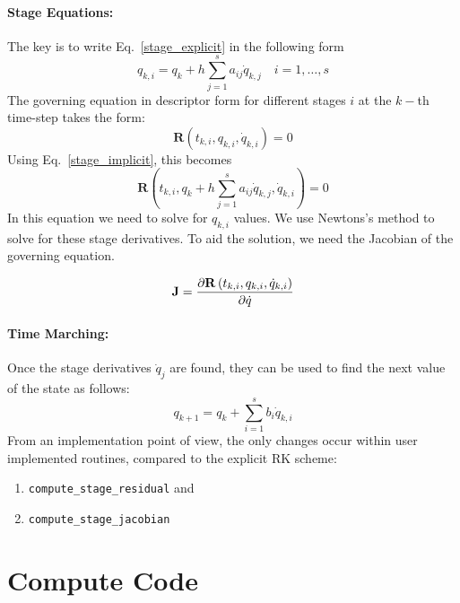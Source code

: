 \documentclass[pdftex,11pt,letter]{article}
\begin{document}
\paragraph{Stage Equations:}
The key is to write Eq.~\ref{stage_explicit} in the following form
\begin{equation}\label{stage_implicit}
  q_{k,i} = q_{k} + h \sum_{j=1}^s a_{ij} \dot{q}_{k,j} \quad i = 1,\ldots,s 
\end{equation}
The governing equation in descriptor form for different stages $i$ at the $k-$th time-step takes the form:
\begin{equation}
  \mathbf{R}\left(t_{k,i}, q_{k,i}, \dot{q}_{k,i}\right) = 0
\end{equation}
Using Eq.~\eqref{stage_implicit}, this becomes
\begin{equation}
  \mathbf{R}\left(t_{k,i}, q_k + h \sum_{j=1}^s a_{ij}\dot{q}_{k,j}, \dot{q}_{k,i}\right) = 0
\end{equation}
In this equation we need to solve for $q_{k,i}$ values. We use
Newtons's method to solve for these stage derivatives. To aid the
solution, we need the Jacobian of the governing equation.

\begin{equation}
  \mathbf{J} = \dfrac{\partial \mathbf{R}\left(t_{k,i},{q}_{k,i},\dot{q}_{k,i}\right)}{\partial \dot{q}}
\end{equation}

\paragraph{Time Marching:}

Once the stage derivatives $\dot{q}_{j}$ are found, they can be used
to find the next value of the state as follows:
\begin{equation}
  q_{k+1} = q_{k} + \sum_{i=1}^s b_i \dot{q}_{k,i}
\end{equation}
From an implementation point of view, the only changes occur within
user implemented  routines, compared to the explicit RK scheme:
\begin{enumerate}
\item \texttt{compute\_stage\_residual} and
\item \texttt{compute\_stage\_jacobian}
\end{enumerate}

\clearpage

\appendix
\section{Compute Code}
\end{document}
